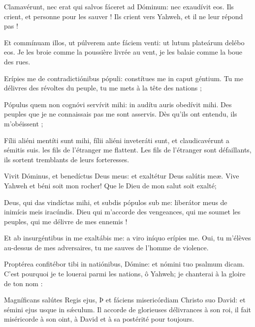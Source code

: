 \begin{paracol}{2}
\LigneParacol{0.2cm}
{Clamavérunt, nec erat qui salvos fáceret ad Dóminum: \GreStar{} nec exaudívit eos.}
{Ils crient, et personne pour les sauver ! Ils crient vers Yahweh, et il ne leur répond pas ! }

\LigneParacol{0.2cm}
{Et commínuam illos, ut púlverem ante fáciem venti: \GreStar{} ut lutum plateárum delébo eos.}
{Je les broie comme la poussière livrée au vent, je les balaie comme la boue des rues. }

\LigneParacol{0.2cm}
{Erípies me de contradictiónibus pópuli: \GreStar{} constítues me in caput géntium.}
{Tu me délivres des révoltes du peuple, tu me mets à la tête des nations ;}

\LigneParacol{0.2cm}
{Pópulus quem non cognóvi servívit mihi: \GreStar{} in audítu auris obedívit mihi.}
{Des peuples que je ne connaissais pas me sont asservis. Dès qu'ils ont entendu, ils m'obéissent ;}

\LigneParacol{0.2cm}
{Fílii aliéni mentíti sunt mihi, \GreStar{} fílii aliéni inveteráti sunt, et claudicavérunt a sémitis suis.}
{les fils de l'étranger me flattent. Les fils de l'étranger sont défaillants, ils sortent tremblants de leurs forteresses. }

\Gloria

\LigneParacol{0.2cm}
{Vivit Dóminus, et benedíctus Deus meus: \GreStar{} et exaltétur Deus salútis meæ.}
{Vive Yahweh et béni soit mon rocher! Que le Dieu de mon salut soit exalté; }

\LigneParacol{0.2cm}
{Deus, qui das vindíctas mihi, et subdis pópulos sub me: \GreStar{} liberátor meus de inimícis meis iracúndis.}
{Dieu qui m'accorde des vengeances, qui me soumet les peuples, qui me délivre de mes ennemis !}

\LigneParacol{0.2cm}
{Et ab insurgéntibus in me exaltábis me: \GreStar{} a viro iníquo erípies me.}
{Oui, tu m'élèves au-dessus de mes adversaires, tu me sauves de l'homme de violence. }

\LigneParacol{0.2cm}
{Proptérea confitébor tibi in natiónibus, Dómine: \GreStar{} et nómini tuo psalmum dicam.}
{C'est pourquoi je te louerai parmi les nations, ô Yahweh; je chanterai à la gloire de ton nom :}

\LigneParacol{0.2cm}
{Magníficans salútes Regis ejus, Þ et fáciens misericórdiam Christo suo David: \GreStar{} et sémini ejus usque in sǽculum.}
{Il accorde de glorieuses délivrances à son roi, il fait miséricorde à son oint, à David et à sa postérité pour toujours. }

\end{paracol}

